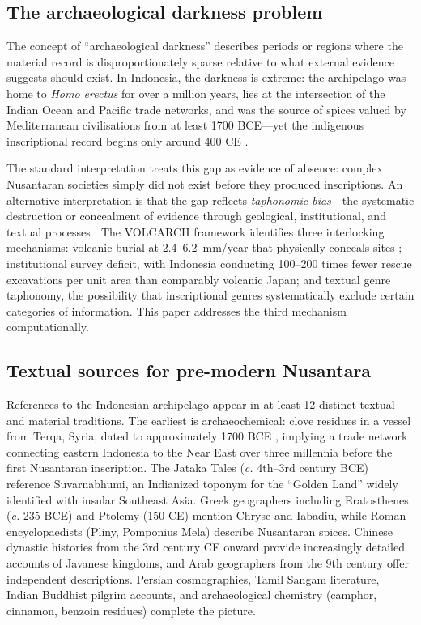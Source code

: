 \documentclass[12pt]{article}
\begin{document}
\subsection{The archaeological darkness problem}

The concept of ``archaeological darkness'' describes periods or regions where the material record is disproportionately sparse relative to what external evidence suggests should exist.
In Indonesia, the darkness is extreme: the archipelago was home to \textit{Homo erectus} for over a million years, lies at the intersection of the Indian Ocean and Pacific trade networks, and was the source of spices valued by Mediterranean civilisations from at least 1700 BCE---yet the indigenous inscriptional record begins only around 400 CE \citep{Coedes1968, Vogel1918}.

The standard interpretation treats this gap as evidence of absence: complex Nusantaran societies simply did not exist before they produced inscriptions.
An alternative interpretation is that the gap reflects \emph{taphonomic bias}---the systematic destruction or concealment of evidence through geological, institutional, and textual processes \citep{Schiffer1987}.
The VOLCARCH framework \citep[submitted]{Amien2026a} identifies three interlocking mechanisms: volcanic burial at 2.4--6.2~mm/year that physically conceals sites \citep{Lavigne2000}; institutional survey deficit, with Indonesia conducting 100--200 times fewer rescue excavations per unit area than comparably volcanic Japan; and textual genre taphonomy, the possibility that inscriptional genres systematically exclude certain categories of information.
This paper addresses the third mechanism computationally.

\subsection{Textual sources for pre-modern Nusantara}

References to the Indonesian archipelago appear in at least 12 distinct textual and material traditions.
The earliest is archaeochemical: clove residues in a vessel from Terqa, Syria, dated to approximately 1700 BCE \citep{Rageot2023}, implying a trade network connecting eastern Indonesia to the Near East over three millennia before the first Nusantaran inscription.
The Jataka Tales (\textit{c.} 4th--3rd century BCE) reference Suvarnabhumi, an Indianized toponym for the ``Golden Land'' widely identified with insular Southeast Asia.
Greek geographers including Eratosthenes (\textit{c.} 235 BCE) and Ptolemy (150 CE) mention Chryse and Iabadiu, while Roman encyclopaedists (Pliny, Pomponius Mela) describe Nusantaran spices.
Chinese dynastic histories from the 3rd century CE onward provide increasingly detailed accounts of Javanese kingdoms, and Arab geographers from the 9th century offer independent descriptions.
Persian cosmographies, Tamil Sangam literature, Indian Buddhist pilgrim accounts, and archaeological chemistry (camphor, cinnamon, benzoin residues) complete the picture.
\end{document}
